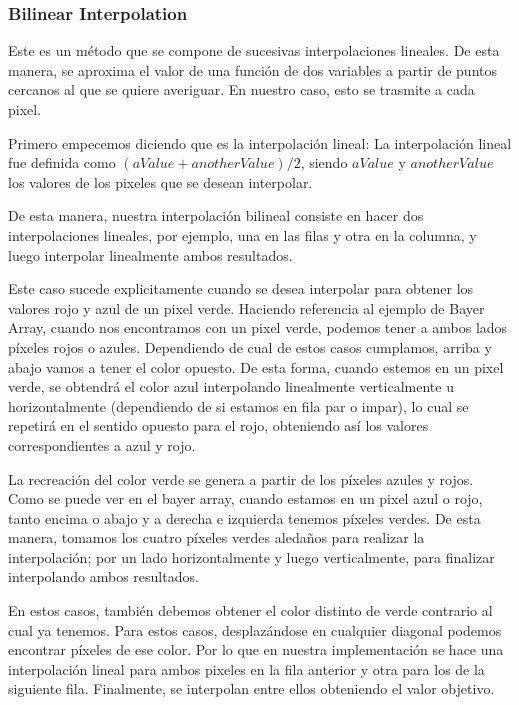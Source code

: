\subsubsection{Bilinear Interpolation}
Este es un método que se compone de sucesivas interpolaciones lineales. De esta manera, se aproxima el valor de una función de dos variables a partir de puntos cercanos al que se quiere averiguar. En nuestro caso, esto se trasmite a cada pixel.  
\par 
Primero empecemos diciendo que es la interpolación lineal:
La interpolación lineal fue definida como \textit{$(aValue + anotherValue)/2$}, siendo $aValue$ y $anotherValue$ los valores de los pixeles que se desean interpolar. 
\par 
De esta manera, nuestra interpolación bilineal consiste en hacer dos interpolaciones lineales, por ejemplo, una en las filas y otra en la columna, y luego interpolar linealmente ambos resultados.
\par 
Este caso sucede explicitamente cuando se desea interpolar para obtener los valores rojo y azul de un pixel verde. Haciendo referencia al ejemplo de Bayer Array, cuando nos encontramos con un pixel verde, podemos tener a ambos lados píxeles rojos o azules. Dependiendo de cual de estos casos cumplamos, arriba y abajo vamos a tener el color opuesto. De esta forma, cuando estemos en un pixel verde, se obtendrá el color azul interpolando linealmente verticalmente u horizontalmente (dependiendo de si estamos en fila par o impar), lo cual se repetirá en el sentido opuesto para el rojo, obteniendo así los valores correspondientes a azul y rojo.
\par 
La recreación del color verde se genera a partir de los píxeles azules y rojos. Como se puede ver en el bayer array, cuando estamos en un pixel azul o rojo, tanto encima o abajo y a derecha e izquierda tenemos píxeles verdes. De esta manera, tomamos los cuatro píxeles verdes aledaños para realizar la interpolación; por un lado horizontalmente y luego verticalmente, para finalizar interpolando ambos resultados. 
\par 
En estos casos, también debemos obtener el color distinto de verde contrario al cual ya tenemos. Para estos casos, desplazándose en cualquier diagonal podemos encontrar píxeles de ese color. Por lo que en nuestra implementación se hace una interpolación lineal para ambos pixeles en la fila anterior y otra para los de la siguiente fila. Finalmente, se interpolan entre ellos obteniendo el valor objetivo.
\par 
